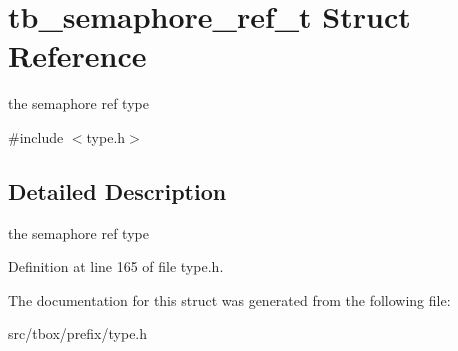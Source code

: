 \hypertarget{structtb__semaphore__ref__t}{\section{tb\-\_\-semaphore\-\_\-ref\-\_\-t Struct Reference}
\label{structtb__semaphore__ref__t}
}


the semaphore ref type  




{\ttfamily \#include $<$type.\-h$>$}



\subsection{Detailed Description}
the semaphore ref type 

Definition at line 165 of file type.\-h.



The documentation for this struct was generated from the following file\-:\begin{DoxyCompactItemize}
\item 
src/tbox/prefix/type.\-h\end{DoxyCompactItemize}
